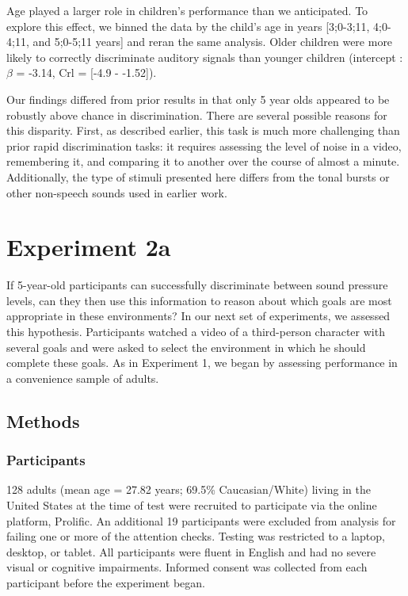 \documentclass[10pt, letterpaper]{article}
\begin{document}
Age played a larger role in children's performance than we anticipated.
To explore this effect, we binned the data by the child's age in years
{[}3;0-3;11, 4;0-4;11, and 5;0-5;11 years{]} and reran the same
analysis. Older children were more likely to correctly discriminate
auditory signals than younger children (intercept : \(\beta\) = -3.14,
Crl = {[}-4.9 - -1.52{]}).

Our findings differed from prior results in that only 5 year olds
appeared to be robustly above chance in discrimination. There are
several possible reasons for this disparity. First, as described
earlier, this task is much more challenging than prior rapid
discrimination tasks: it requires assessing the level of noise in a
video, remembering it, and comparing it to another over the course of
almost a minute. Additionally, the type of stimuli presented here
differs from the tonal bursts or other non-speech sounds used in earlier
work.

\hypertarget{experiment-2a}{%
\section{Experiment 2a}\label{experiment-2a}}

If 5-year-old participants can successfully discriminate between sound
pressure levels, can they then use this information to reason about
which goals are most appropriate in these environments? In our next set
of experiments, we assessed this hypothesis. Participants watched a
video of a third-person character with several goals and were asked to
select the environment in which he should complete these goals. As in
Experiment 1, we began by assessing performance in a convenience sample
of adults.

\hypertarget{methods-2}{%
\subsection{Methods}\label{methods-2}}

\hypertarget{participants-2}{%
\subsubsection{Participants}\label{participants-2}}

128 adults (mean age = 27.82 years; 69.5\% Caucasian/White) living in
the United States at the time of test were recruited to participate via
the online platform, Prolific. An additional 19 participants were
excluded from analysis for failing one or more of the attention checks.
Testing was restricted to a laptop, desktop, or tablet. All participants
were fluent in English and had no severe visual or cognitive
impairments. Informed consent was collected from each participant before
the experiment began.
\end{document}

